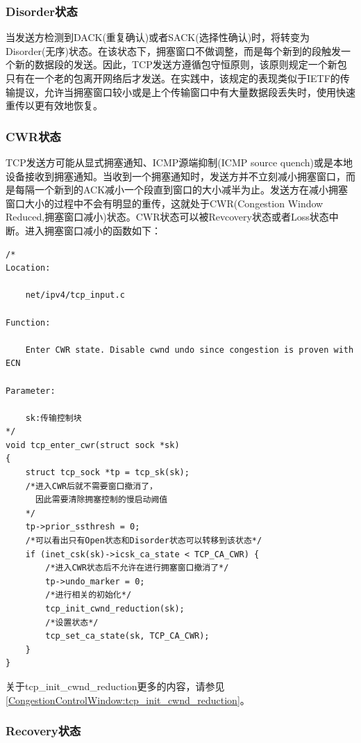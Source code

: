         \subsubsection{Disorder状态}
            当发送方检测到DACK(重复确认)或者SACK(选择性确认)时，将转变为Disorder(无序)状态。在该状态下，拥塞窗口不做调整，而是每个新到的段触发一个新的数据段的发送。因此，TCP发送方遵循包守恒原则，该原则规定一个新包只有在一个老的包离开网络后才发送。在实践中，该规定的表现类似于IETF的传输提议，允许当拥塞窗口较小或是上个传输窗口中有大量数据段丢失时，使用快速重传以更有效地恢复。

        \subsubsection{CWR状态}
            \label{CongestionState:CWR}
            TCP发送方可能从显式拥塞通知、ICMP源端抑制(ICMP source quench)或是本地设备接收到拥塞通知。当收到一个拥塞通知时，发送方并不立刻减小拥塞窗口，而是每隔一个新到的ACK减小一个段直到窗口的大小减半为止。发送方在减小拥塞窗口大小的过程中不会有明显的重传，这就处于CWR(Congestion Window Reduced,拥塞窗口减小)状态。CWR状态可以被Revcovery状态或者Loss状态中断。进入拥塞窗口减小的函数如下：

\begin{verbatim}
/* 
Location:

    net/ipv4/tcp_input.c

Function:

    Enter CWR state. Disable cwnd undo since congestion is proven with ECN 

Parameter:

    sk:传输控制块
*/
void tcp_enter_cwr(struct sock *sk)
{
    struct tcp_sock *tp = tcp_sk(sk);
    /*进入CWR后就不需要窗口撤消了，
      因此需要清除拥塞控制的慢启动阙值
    */
    tp->prior_ssthresh = 0;
    /*可以看出只有Open状态和Disorder状态可以转移到该状态*/
    if (inet_csk(sk)->icsk_ca_state < TCP_CA_CWR) {
        /*进入CWR状态后不允许在进行拥塞窗口撤消了*/     
        tp->undo_marker = 0;
        /*进行相关的初始化*/
        tcp_init_cwnd_reduction(sk);
        /*设置状态*/        
        tcp_set_ca_state(sk, TCP_CA_CWR);
    }
}
\end{verbatim}
        关于tcp\_init\_cwnd\_reduction更多的内容，请参见\ref{CongestionControlWindow:tcp_init_cwnd_reduction}。

        \subsubsection{Recovery状态}

